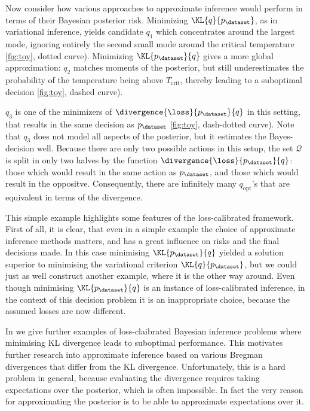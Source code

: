 Now consider how various approaches to approximate inference would perform in terms of their Bayesian posterior risk. Minimizing $\KL{q}{p_\dataset}$, as in variational inference, yields candidate $q_1$ which concentrates around the largest mode, ignoring entirely the second small mode around the critical temperature \ref{fig:toy}, dotted curve). Minimizing $\KL{p_\dataset}{q}$ gives a more global approximation: $q_2$ matches moments of the posterior, but still underestimates the probability of the temperature being above $T_\mathrm{crit}$, thereby leading to a suboptimal decision \ref{fig:toy}, dashed curve).

$q_3$ is one of the minimizers of $\divergence{\loss}{p_\dataset}{q}$ in this setting, that results in the same decision as $p_\dataset$ \ref{fig:toy}, dash-dotted curve). Note that $q_3$ does not model all aspects of the posterior, but it estimates the Bayes-decision well. Because there are only two possible actions in this setup, the set $\mathcal{Q}$ is split in only two halves by the function $\divergence{\loss}{p_\dataset}{q}$: those which would result in the same action as $p_{\dataset}$, and those which would result in the oppositve. Consequently, there are infinitely many $q_\mathrm{opt}$'s that are equivalent in terms of the divergence.

This simple example highlights some features of the loss-calibrated framework. First of all, it is clear, that even in a simple example the choice of approximate inference methods matters, and has a great influence on risks and the final decisions made. In this case minimising $\KL{p_\dataset}{q}$ yielded a solution superior to minimising the variational criterion $\KL{q}{p_\dataset}$, but we could just as well construct another example, where it is the other way around. Even though minimising $\KL{p_\dataset}{q}$ is an instance of loss-calibrated inference, in the context of this decision problem it is an inappropriate choice, because the assumed losses are now different.

In \citep{Lacoste2011} we give further examples of loss-claibrated Bayesian inference problems where minimising KL divergence leads to suboptimal performance. This motivates further research into approximate inference based on various Bregman divergences that differ from the KL divergence. Unfortunately, this is a hard problem in general, because evaluating the divergence requires taking expectations over the posterior, which is often impossible. In fact the very reason for approximating the posterior is to be able to approximate expectations over it.

